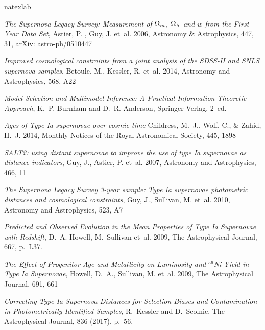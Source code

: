 \documentclass[a4paper, 12pt, svgnames]{article}
\begin{document}

\begin{thebibliography}{23}
\expandafter\ifx\csname natexlab\endcsname\relax\def\natexlab#1{#1}\fi

{\em The {Supernova} {Legacy} {Survey}: {Measurement} of $\Omega_m$, $\Omega_\Lambda$ and $w$
from the {First} {Year} {Data} {Set}}, Astier, P. , Guy, J. et~al. 2006,
Astronomy \& Astrophysics, 447, 31, arXiv: astro-ph/0510447

{\em Improved cosmological constraints from a joint analysis of the {SDSS}-{II}
and {SNLS} supernova samples}, Betoule, M., Kessler, R. et~al. 2014, Astronomy
and Astrophysics, 568, A22

{\em Model Selection and Multimodel Inference: A Practical Information-Theoretic
Approach}, K.~P. Burnham and D.~R. Anderson, Springer-Verlag, 2~ed.

{\em Ages of {Type} {Ia} supernovae over cosmic time} Childress, M.~J., Wolf,
C., \& Zahid, H.~J. 2014, Monthly Notices of the Royal Astronomical Society,
445, 1898

{\em {SALT}2: using distant supernovae to improve the use of type {Ia}
supernovae as distance indicators}, Guy, J., Astier, P. et~al. 2007, Astronomy
and Astrophysics, 466, 11

{\em The {Supernova} {Legacy} {Survey} 3-year sample: {Type} {Ia} supernovae
photometric distances and cosmological constraints}, Guy, J., Sullivan, M.
et~al. 2010, Astronomy and Astrophysics, 523, A7

{\em Predicted and Observed Evolution in the Mean Properties of Type Ia
Supernovae with Redshift}, D.~A. Howell, M.~Sullivan et~al. 2009, The
Astrophysical Journal, 667, p.~L37.

{\em The {Effect} of {Progenitor} {Age} and {Metallicity} on {Luminosity} and
$^{56}${Ni} {Yield} in {Type} {Ia} {Supernovae}}, Howell, D.~A., Sullivan, M.
et~al. 2009, The Astrophysical Journal, 691, 661

{\em Correcting {Type} {Ia} {Supernova} {Distances} for {Selection} {Biases} and
{Contamination} in {Photometrically} {Identified} {Samples}}, R.~Kessler and
D.~Scolnic, The Astrophysical Journal, 836 (2017), p.~56.


\end{thebibliography}
\end{document}
